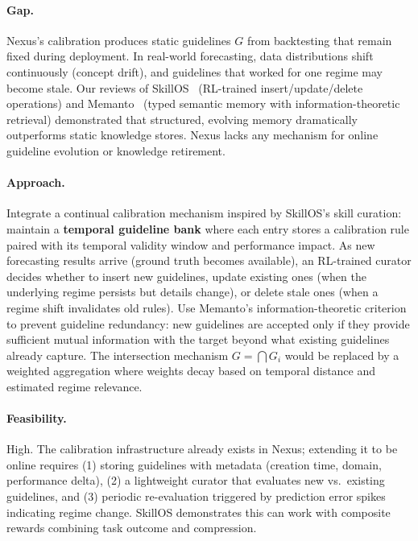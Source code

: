 \documentclass[11pt,a4paper]{article}
\begin{document}
\paragraph{Gap.} Nexus's calibration produces static guidelines $G$ from backtesting that remain fixed during deployment. In real-world forecasting, data distributions shift continuously (concept drift), and guidelines that worked for one regime may become stale. Our reviews of SkillOS~\cite{skillos} (RL-trained insert/update/delete operations) and Memanto~\cite{memanto} (typed semantic memory with information-theoretic retrieval) demonstrated that structured, evolving memory dramatically outperforms static knowledge stores. Nexus lacks any mechanism for online guideline evolution or knowledge retirement.

\paragraph{Approach.} Integrate a continual calibration mechanism inspired by SkillOS's skill curation: maintain a \textbf{temporal guideline bank} where each entry stores a calibration rule paired with its temporal validity window and performance impact. As new forecasting results arrive (ground truth becomes available), an RL-trained curator decides whether to insert new guidelines, update existing ones (when the underlying regime persists but details change), or delete stale ones (when a regime shift invalidates old rules). Use Memanto's information-theoretic criterion to prevent guideline redundancy: new guidelines are accepted only if they provide sufficient mutual information with the target beyond what existing guidelines already capture. The intersection mechanism $G = \bigcap G_i$ would be replaced by a weighted aggregation where weights decay based on temporal distance and estimated regime relevance.

\paragraph{Feasibility.} High. The calibration infrastructure already exists in Nexus; extending it to be online requires (1) storing guidelines with metadata (creation time, domain, performance delta), (2) a lightweight curator that evaluates new vs.\ existing guidelines, and (3) periodic re-evaluation triggered by prediction error spikes indicating regime change. SkillOS demonstrates this can work with composite rewards combining task outcome and compression.
\end{document}
